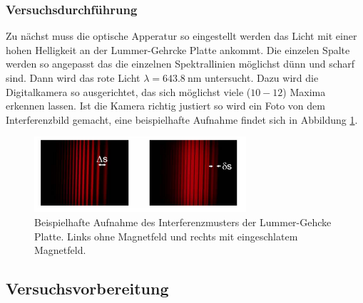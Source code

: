 \subsubsection{Versuchsdurchführung}
Zu nächst muss die optische Apperatur so eingestellt werden das Licht mit einer hohen Helligkeit
an der Lummer-Gehrcke Platte ankommt. Die einzelen Spalte werden so angepasst das die
einzelnen Spektrallinien möglichst dünn und scharf sind.
Dann wird das rote Licht $\lambda = \SI{643.8}{\nano\meter}$ untersucht.
Dazu wird die Digitalkamera so ausgerichtet, das sich möglichst viele ($10-12$) Maxima erkennen lassen.
Ist die Kamera richtig justiert so wird ein Foto von dem Interferenzbild gemacht, eine beispielhafte Aufnahme
findet sich in Abbildung \ref{fig: bsp_foto}.

\FloatBarrier
\begin{figure}[h]
  \centering
  \includegraphics[width=0.7\textwidth]{pics/bsp_foto.png}
  \caption{Beispielhafte Aufnahme des Interferenzmusters der Lummer-Gehcke Platte. Links ohne Magnetfeld und rechts mit eingeschlatem Magnetfeld\cite{anleitung27}.}
  \label{fig: bsp_foto}
\end{figure}
\FloatBarrier



\subsection{Versuchsvorbereitung}
